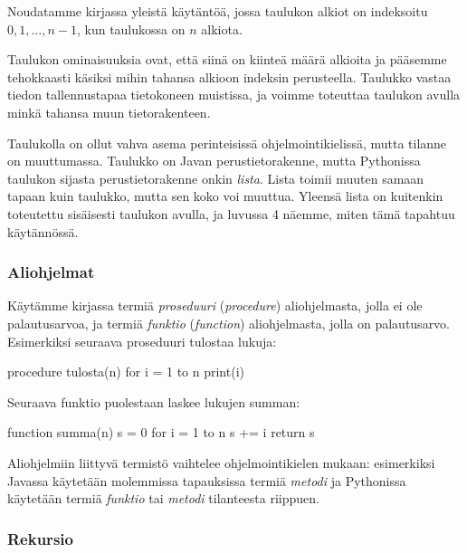 Noudatamme kirjassa yleistä käytäntöä, jossa taulukon alkiot on indeksoitu
$0,1,\dots,n-1$, kun taulukossa on $n$ alkiota.

Taulukon ominaisuuksia ovat, että siinä on kiinteä määrä alkioita ja
pääsemme tehokkaasti käsiksi mihin tahansa alkioon indeksin perusteella.
Taulukko vastaa tiedon tallennustapaa tietokoneen muistissa,
ja voimme toteuttaa taulukon avulla minkä tahansa muun tietorakenteen.


Taulukolla on ollut vahva asema perinteisissä ohjelmointikielissä,
mutta tilanne on muuttumassa.
Taulukko on Javan perustietorakenne, mutta Pythonissa
taulukon sijasta perustietorakenne onkin \emph{lista}.
Lista toimii muuten samaan tapaan kuin taulukko,
mutta sen koko voi muuttua.
Yleensä lista on kuitenkin toteutettu sisäisesti taulukon avulla,
ja luvussa 4 näemme, miten tämä tapahtuu käytännössä.

\subsubsection{Aliohjelmat}


Käytämme kirjassa termiä \emph{proseduuri} (\emph{procedure})
aliohjelmasta, jolla ei ole palautusarvoa,
ja termiä \emph{funktio} (\emph{function}) aliohjelmasta, jolla on palautusarvo.
Esimerkiksi seuraava proseduuri tulostaa lukuja:

\begin{code}
procedure tulosta(n)
    for i = 1 to n
        print(i)
\end{code}

Seuraava funktio puolestaan laskee lukujen summan:

\begin{code}
function summa(n)
    s = 0
    for i = 1 to n
        s += i
    return s
\end{code}

Aliohjelmiin liittyvä termistö vaihtelee ohjelmointikielen mukaan:
esimerkiksi Javassa käytetään molemmissa tapauksissa termiä
\emph{metodi} ja Pythonissa käytetään termiä \emph{funktio} tai
\emph{metodi} tilanteesta riippuen.

\subsubsection{Rekursio}


